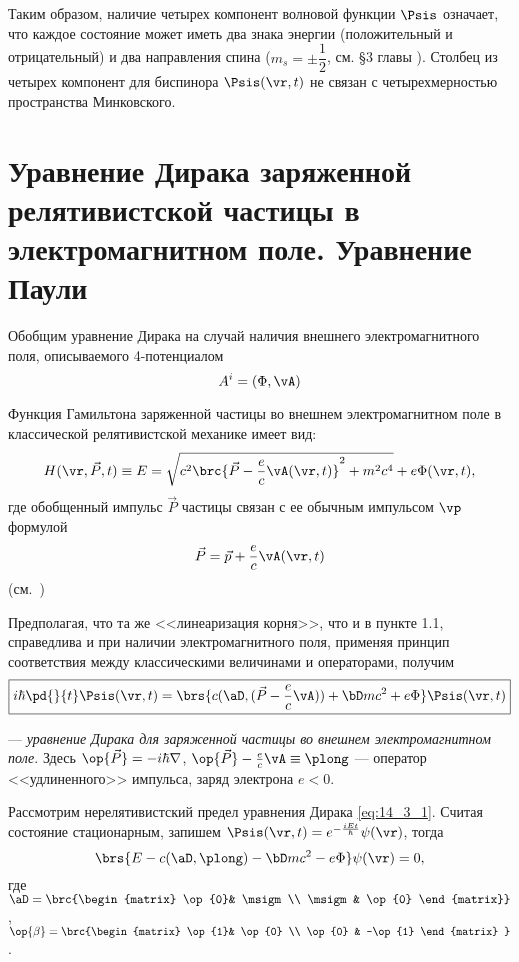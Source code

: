 Таким образом, наличие четырех компонент волновой функции $\Psis$ означает, что каждое состояние может иметь два знака энергии (положительный и отрицательный) и два направления спина ($m_s = \pm \dfrac{1}{2}$, см. \S 3 главы ). Столбец из четырех компонент для биспинора $\Psis(\vr, t)$ не связан с четырехмерностью пространства Минковского. 

\begin{sloppypar}
\section{Уравнение Дирака заряженной релятивистской частицы в электромагнитном поле. Уравнение Паули}
\end{sloppypar}

Обобщим уравнение Дирака на случай наличия внешнего электромагнитного поля, описываемого 4-потенциалом
$$
A^i=(\Phi, \vA)
$$

Функция Гамильтона заряженной частицы во внешнем электромагнитном поле в классической релятивистской механике имеет вид:
$$
H(\vr, \vec{P}, t) \equiv E = \sqrt{c^2\brc{\vec{P} - \frac{e}{c}\vA(\vr, t)}^2 + m^2c^4} + e\Phi(\vr, t),
$$
где обобщенный импульс $\vec{P}$ частицы связан с ее обычным импульсом $\vp$ формулой
$$
\vec{P} = \vec{p} + \frac{e}{c}\vA(\vr, t)
$$
(см.~)

Предполагая, что та же <<линеаризация корня>>, что и в пункте 1.1, справедлива и при наличии электромагнитного поля, применяя принцип соответствия между классическими величинами и операторами, получим  
\begin{equation}
\label{eq:14_3_1}
\boxed{i \hbar \pd{}{t} \Psis(\vr, t) = \brs{c(\aD, (\vec{P} - \frac{e}{c} \vA)) + \bD mc^2 + e\Phi} \Psis(\vr, t)}
\end{equation}

--- {\em уравнение Дирака для заряженной частицы во внешнем электромагнитном поле}. Здесь $\op{\vec{P}} = - i \hbar \nabla$, $\op{\vec{P}} - \frac{e}{c} \vA \equiv \plong$ --- оператор <<удлиненного>> импульса, заряд электрона $e < 0$.

Рассмотрим нерелятивистский предел уравнения Дирака \eqref{eq:14_3_1}. Считая состояние стационарным, запишем $\Psis(\vr, t) = e^{-\frac{iEt}{\hbar}} \psi(\vr)$, тогда
\begin{equation}
\label{eq:14_3_2}
\brs{E - c(\aD, \plong) - \bD mc^2 - e\Phi} \psi(\vr) = 0,
\end{equation}
где $\aD = \brc{\begin{matrix} \op{0}& \msigm \\ \msigm &  \op{0} \end{matrix}}$ , $\op{\beta} = \brc{\begin{matrix} \op{1}& \op{0} \\ \op{0} &  -\op{1} \end{matrix} }$.

